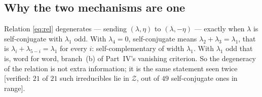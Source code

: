 \documentclass[11pt,a4paper]{article}
\begin{document}
\subsection*{Why the two mechanisms are one}

Relation \eqref{eq:rel} degenerates --- sending $(\lambda,\eta)$ to $(\lambda,-\eta)$ --- exactly when
$\lambda$ is self-conjugate with $\lambda_1$ odd. With $\lambda_4=0$, self-conjugate means
$\lambda_2+\lambda_3=\lambda_1$, that is $\lambda_i+\lambda_{5-i}=\lambda_1$ for every $i$:
self-complementary of width $\lambda_1$. With $\lambda_1$ odd that is, word for word, branch~(b) of
Part~IV's vanishing criterion. So the degeneracy of the relation is not extra information; it is the
same statement seen twice [verified: $21$ of $21$ such irreducibles lie in $\mathcal Z$, out of $49$
self-conjugate ones in range].
\end{document}
